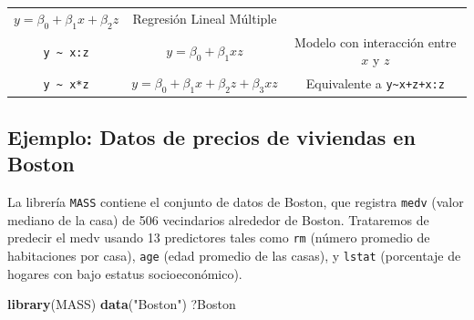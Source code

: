 \documentclass[]{book}
\newenvironment{Shaded}{\begin{snugshade}}{\end{snugshade}}
\newcommand{\KeywordTok}[1]{\textcolor[rgb]{0.13,0.29,0.53}{\textbf{#1}}}
\newcommand{\StringTok}[1]{\textcolor[rgb]{0.31,0.60,0.02}{#1}}
\newcommand{\NormalTok}[1]{#1}
\begin{document}
\begin{longtable}[]{@{}ccc@{}}
\begin{minipage}[t]{0.28\columnwidth}
\(y = \beta_0+\beta_1x+\beta_2z\)\strut
\end{minipage} & \begin{minipage}[t]{0.46\columnwidth}\centering\strut
Regresión Lineal Múltiple\strut
\end{minipage}\tabularnewline
\begin{minipage}[t]{0.17\columnwidth}\centering\strut
\texttt{y\ \textasciitilde{}\ x:z}\strut
\end{minipage} & \begin{minipage}[t]{0.28\columnwidth}\centering\strut
\(y = \beta_0+\beta_1xz\)\strut
\end{minipage} & \begin{minipage}[t]{0.46\columnwidth}\centering\strut
Modelo con interacción entre \(x\) y \(z\)\strut
\end{minipage}\tabularnewline
\begin{minipage}[t]{0.17\columnwidth}\centering\strut
\texttt{y\ \textasciitilde{}\ x*z}\strut
\end{minipage} & \begin{minipage}[t]{0.28\columnwidth}\centering\strut
\(y = \beta_0+\beta_1x+\beta_2z+\beta_3xz\)\strut
\end{minipage} & \begin{minipage}[t]{0.46\columnwidth}\centering\strut
Equivalente a \texttt{y\textasciitilde{}x+z+x:z}\strut
\end{minipage}\tabularnewline
\bottomrule
\end{longtable}

\subsection{Ejemplo: Datos de precios de viviendas en
Boston}\label{ejemplo-datos-de-precios-de-viviendas-en-boston}

La librería \texttt{MASS} contiene el conjunto de datos de Boston, que
registra \texttt{medv} (valor mediano de la casa) de 506 vecindarios
alrededor de Boston. Trataremos de predecir el medv usando 13
predictores tales como \texttt{rm} (número promedio de habitaciones por
casa), \texttt{age} (edad promedio de las casas), y \texttt{lstat}
(porcentaje de hogares con bajo estatus socioeconómico).

\begin{Shaded}
\begin{Highlighting}[]
\KeywordTok{library}\NormalTok{(MASS)}
\KeywordTok{data}\NormalTok{(}\StringTok{"Boston"}\NormalTok{)}
\NormalTok{?Boston}
\end{Highlighting}
\end{Shaded}
\end{document}
